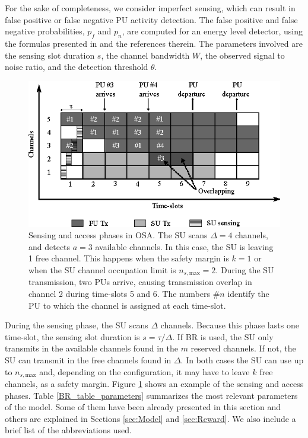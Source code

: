 For the sake of completeness, we consider imperfect sensing, which can result in false positive or false negative PU activity detection. The false positive and false negative probabilities, $p_{f}$ and $p_{n}$, are computed for an energy level detector, using the formulas presented in \cite{ref:Pawelczak2009} and the references therein. The parameters involved are the sensing slot duration $s$, the channel bandwidth $W$, the observed signal to noise ratio, and the detection threshold $\theta$.

\begin{figure}[ht]
\centering
\includegraphics[scale=1]{slots.eps}
\caption[]{Sensing and access phases in OSA. The SU scans $\Delta=4$ channels, and detects $a=3$ available channels. In this case, the SU is leaving 1 free channel. This happens when the safety margin is $k=1$ or when the SU channel occupation limit is $n_{s,\text{max}}=2$. During the SU transmission, two PUs arrive, causing transmission overlap in channel 2 during time-slots 5 and 6. The numbers $\#n$ identify the PU to which the channel is assigned at each time-slot.}\label{BR_fig_slots}
\end{figure}

During the sensing phase, the SU scans $\Delta$ channels.
Because this phase lasts one time-slot, the sensing slot duration is $s=\tau/\Delta$.
If BR is used, the SU only transmits in the available channels found in the $m$ reserved channels. If not, the SU can transmit in the free channels found in $\Delta$.  
In both cases the SU can use up to $n_{s,\text{max}}$ and, depending on the configuration, it may have to leave $k$ free channels, as a safety margin.
Figure \ref{BR_fig_slots} shows an example of the sensing and access phases.
Table \ref{BR_table_parameters} summarizes the most relevant parameters of the model. Some of them have been already presented in this section and others are explained in Sections \ref{sec:Model} and \ref{sec:Reward}. We also include a brief list of the abbreviations used.

